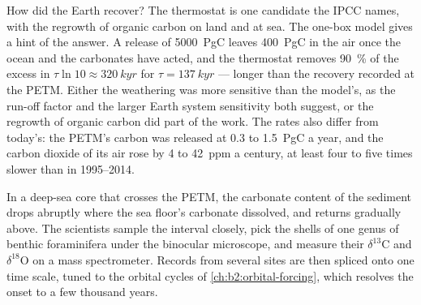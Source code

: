 \begin{omfigure}
\centering
{}
\par{}
\end{omfigure}

How did the Earth recover? The thermostat is one candidate the IPCC names, with the regrowth of
organic carbon on land and at sea. The one-box model gives a hint of the answer. A release of
\qty{5000}{PgC} leaves \qty{400}{PgC} in the air once the ocean and the carbonates have acted, and
the thermostat removes \qty{90}{\percent} of the excess in $\tau\ln 10 \approx \qty{320}{kyr}$ for
$\tau = \qty{137}{kyr}$ --- longer than the recovery recorded at the PETM. Either the weathering
was more sensitive than the model's, as the run-off factor and the larger Earth system sensitivity
both suggest, or the regrowth of organic carbon did part of the work. The rates also differ from
today's: the PETM's carbon was released at 0.3 to \qty{1.5}{PgC} a year, and the carbon dioxide of
its air rose by 4 to \qty{42}{ppm} a century, at least four to five times slower than in 1995--2014.

\begin{inthelab}
In a deep-sea core that crosses the PETM, the carbonate content of the sediment drops abruptly
where the sea floor's carbonate dissolved, and returns gradually above. The scientists sample the
interval closely, pick the shells of one genus of benthic foraminifera under the binocular
microscope, and measure their $\delta^{13}$C and $\delta^{18}$O on a mass spectrometer. Records from
several sites are then spliced onto one time scale, tuned to the orbital cycles of
\cref{ch:b2:orbital-forcing}, which resolves the onset to a few thousand years.
\end{inthelab}

